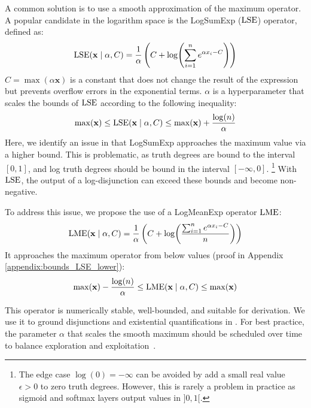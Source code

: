 \documentclass{article}
\theoremstyle{definition}
\begin{document}
A common solution is to use a smooth approximation of the maximum operator.
A popular candidate in the logarithm space is the LogSumExp ($\operatorname{LSE}$) operator, defined as:
\begin{align}
    \operatorname{LSE}(\mathbf{x} \mid \alpha, C) = \frac{1}{\alpha} \left( C + \log(\sum_{i=1}^n e^{\alpha x_i - C})\right)\\
\end{align}
$C=\max(\alpha \mathbf{x})$ is a constant that does not change the result of the expression but prevents overflow errors in the exponential terms.
$\alpha$ is a hyperparameter that scales the bounds of $\operatorname{LSE}$ according to the following inequality:
\begin{equation}
    \label{eq:bounds_LSE_traditional}
    \max(\mathbf{x}) \leq \operatorname{LSE}(\mathbf{x} \mid \alpha, C) \leq \max(\mathbf{x}) + \frac{\log(n)}{\alpha}
\end{equation}
Here, we identify an issue in that LogSumExp approaches the maximum value via a higher bound.
This is problematic, as truth degrees are bound to the interval $[0,1]$, 
and log truth degrees should be bound in the interval $\left[-\infty,0\right]$.
\footnote{The edge case $\log(0) = -\infty$ can be avoided by add a small real value $\epsilon>0$ to zero truth degrees. 
However, this is rarely a problem in practice as sigmoid and softmax layers output values in $]0,1[$.}
With $\operatorname{LSE}$, the output of a log-disjunction can exceed these bounds and become non-negative.

To address this issue, we propose the use of a LogMeanExp operator $\operatorname{LME}$:
\begin{equation}
    \label{eq:LME}
    \operatorname{LME}(\mathbf{x} \mid \alpha, C) = \frac{1}{\alpha} \left( C + \log(\frac{\sum_{i=1}^n e^{\alpha x_i-C}}{n} ) \right)
\end{equation}
It approaches the maximum operator from below values (proof in Appendix \ref{appendix:bounds_LSE_lower}):
\begin{equation}
    \label{eq:bounds_LSE_lower}
    \max(\mathbf{x}) - \frac{\log(n)}{\alpha} \leq \operatorname{LME}(\mathbf{x} \mid \alpha, C) \leq \max(\mathbf{x})
\end{equation}

This operator is numerically stable, well-bounded, and suitable for derivation.
We use it to ground disjunctions and existential quantifications in \logLTN. 
For best practice, the parameter $\alpha$ that scales the smooth maximum should be scheduled over time to balance exploration and exploitation~\cite{badreddine_logic_2022}.
\end{document}

